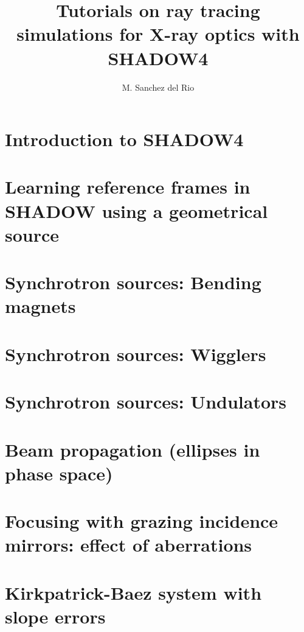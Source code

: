 \documentclass{ol-softwaremanual}
\title{Tutorials on ray tracing simulations for X-ray optics with SHADOW4}
\author{M. Sanchez del Rio}
\begin{document}
\maketitle

\tableofcontents

\newpage
\section{Introduction to SHADOW4}



\newpage
\section{Learning reference frames in SHADOW using a geometrical source}




\newpage
\section{Synchrotron sources: Bending magnets}



\newpage
\section{Synchrotron sources: Wigglers}



\newpage
\section{Synchrotron sources: Undulators}



\newpage
\section{Beam propagation (ellipses in phase space)}




\newpage
\section{Focusing with grazing incidence mirrors: effect of aberrations}



\newpage
\section{Kirkpatrick-Baez system with slope errors}


\end{document}
